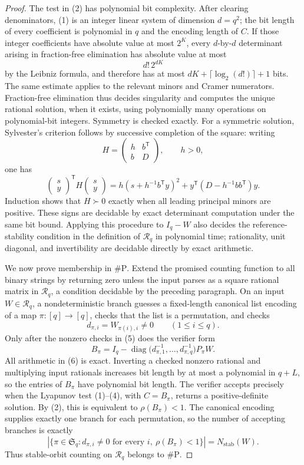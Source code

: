 \documentclass{article}
\begin{document}
\begin{proof}
The test in (2) has polynomial bit complexity. After clearing denominators, (1) is an integer linear system of dimension \(d=q^2\); the bit length of every coefficient is polynomial in \(q\) and the encoding length of \(C\). If those integer coefficients have absolute value at most \(2^K\), every \(d\)-by-\(d\) determinant arising in fraction-free elimination has absolute value at most
\[
 d!\,2^{dK}
\]
by the Leibniz formula, and therefore has at most \(dK+\lceil\log_2(d!)\rceil+1\) bits. The same estimate applies to the relevant minors and Cramer numerators. Fraction-free elimination thus decides singularity and computes the unique rational solution, when it exists, using polynomially many operations on polynomial-bit integers. Symmetry is checked exactly. For a symmetric solution, Sylvester's criterion follows by successive completion of the square: writing
\[
 H=\begin{pmatrix}h&b^{\mathsf T}\\ b&D\end{pmatrix},
 \qquad h>0,
\]
one has
\[
 \begin{pmatrix}s\\y\end{pmatrix}^{\!\mathsf T}
 H
 \begin{pmatrix}s\\y\end{pmatrix}
 =h\left(s+h^{-1}b^{\mathsf T}y\right)^2
  +y^{\mathsf T}\left(D-h^{-1}bb^{\mathsf T}\right)y.
\]
Induction shows that \(H\succ0\) exactly when all leading principal minors are positive. These signs are decidable by exact determinant computation under the same bit bound. Applying this procedure to \(I_q-W\) also decides the reference-stability condition in the definition of \(\mathcal R_q\) in polynomial time; rationality, unit diagonal, and invertibility are decidable directly by exact arithmetic.

We now prove membership in \(\#\mathrm P\). Extend the promised counting function to all binary strings by returning zero unless the input parses as a square rational matrix in \(\mathcal R_q\), a condition decidable by the preceding paragraph. On an input \(W\in\mathcal R_q\), a nondeterministic branch guesses a fixed-length canonical list encoding of a map \(\pi:[q]\to[q]\), checks that the list is a permutation, and checks
\[
 d_{\pi,i}=W_{\pi(i),i}\neq0
 \qquad(1\leq i\leq q). \tag{5}
\]
Only after the nonzero checks in (5) does the verifier form
\[
 B_\pi
 =I_q-
 \operatorname{diag}\bigl(d_{\pi,1}^{-1},\ldots,d_{\pi,q}^{-1}\bigr)
 P_\pi W. \tag{6}
\]
All arithmetic in (6) is exact. Inverting a checked nonzero rational and multiplying input rationals increases bit length by at most a polynomial in \(q+L\), so the entries of \(B_\pi\) have polynomial bit length. The verifier accepts precisely when the Lyapunov test (1)--(4), with \(C=B_\pi\), returns a positive-definite solution. By (2), this is equivalent to \(\rho(B_\pi)<1\). The canonical encoding supplies exactly one branch for each permutation, so the number of accepting branches is exactly
\[
 |\{\pi\in\mathfrak S_q:d_{\pi,i}\neq0\text{ for every }i,\ 
 \rho(B_\pi)<1\}|
 =N_{\mathrm{stab}}(W).
\]
Thus stable-orbit counting on \(\mathcal R_q\) belongs to \(\#\mathrm P\).


\end{proof}
\end{document}
